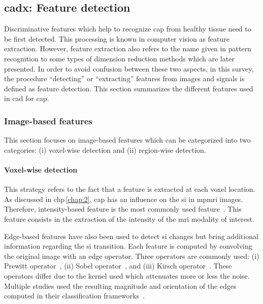 \subsection{\acs*{cadx}: Feature detection} \label{subsec:chp3:img-clas:CADX-fea-dec}

Discriminative features which help to recognize \ac{cap} from healthy tissue need to be first detected.
This processing is known in computer vision as feature extraction. 
However, feature extraction also refers to the name given in pattern recognition to some types of dimension reduction methods which are later presented.
In order to avoid confusion between these two aspects, in this survey, the procedure ``detecting'' or ``extracting'' features from images and signals is defined as feature detection.
This section summarizes the different features used in \ac{cad} for \ac{cap}.

\subsubsection{Image-based features}\label{subsubsec:chp3:img-clas:CADX-fea-dec:Img-fea}

This section focuses on image-based features which can be categorized into two categories: (i) voxel-wise detection and (ii) region-wise detection.

\paragraph{Voxel-wise detection}
This strategy refers to the fact that a feature is extracted at each voxel location.
As discussed in \acs{chp}\,\ref{chap:2}, \ac{cap} has an influence on the \ac{si} in \ac{mpmri} images.
Therefore, intensity-based feature is the most commonly used feature~\cite{Ampeliotis2007,Ampeliotis2008,Vos2008,rampun2016computerb,rampun2015classifying,Giannini2013,Artan2009,Artan2010,Chan2003,Langer2009,Litjens2011,Litjens2012,Litjens2014,Liu2009,Ozer2009,Ozer2010,trigui2016classification,trigui2017automatic,cameron2014multiparametric,cameron2016maps,khalvati2015automated,chung2015prostate,giannini2015fully,Niaf2011,Niaf2012,lehaire2014computer}.
This feature consists in the extraction of the intensity of the \ac{mri} modality of interest.

Edge-based features have also been used to detect \ac{si} changes but bring additional information regarding the \ac{si} transition.
Each feature is computed by convolving the original image with an edge operator.
Three operators are commonly used: (i) Prewitt operator~\cite{Prewitt1970}, (ii) Sobel operator~\cite{Sobel1970}, and (iii) Kirsch operator~\cite{Kirsch1971}.
These operators differ due to the kernel used which attenuates more or less the noise.
Multiple studies used the resulting magnitude and orientation of the edges computed in their classification frameworks~\cite{Niaf2011,Niaf2012,Tiwari2009a,Tiwari2010,Tiwari2013,Viswanath2008,Viswanath2011,rampun2016quantitative,rampun2015computer,rampun2016computer,lehaire2014computer,khalvati2015automated,chung2015prostate}.

